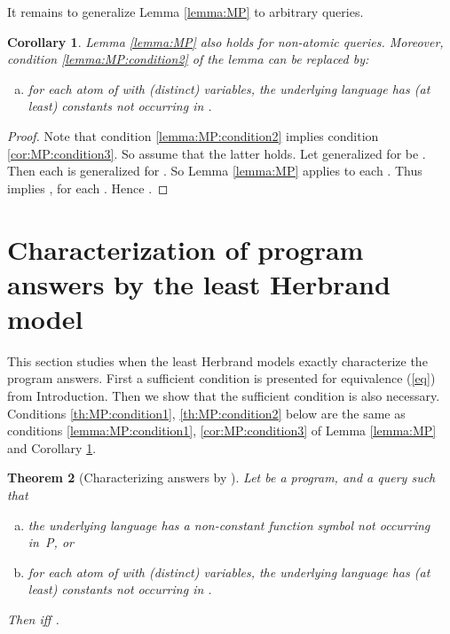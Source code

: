 \documentclass[a4paper]{tlp2}
\newtheorem{theorem}{Theorem}
\newtheorem{corollary}[theorem]{Corollary}
\begin{document}
It remains to generalize Lemma \ref{lemma:MP} to arbitrary queries.

\begin{corollary}
\label{cor:MP}
Lemma \ref{lemma:MP} also holds for non-atomic queries.  Moreover, condition
\ref{lemma:MP:condition2} of the lemma can be replaced by:
\begin{enumerate}[(a)]
\setcounter{enumi}2
\item
\label{cor:MP:condition3}
for each atom  of  with   (distinct) variables,
the underlying language has (at least)  constants not occurring in .
\end{enumerate}
\end{corollary}

\begin{proof}
Note that condition \ref{lemma:MP:condition2} implies condition
\ref{cor:MP:condition3}.
So assume that the latter holds.
Let   generalized for  be .
Then each  is   generalized for .
So Lemma \ref{lemma:MP} applies to each .  Thus  implies
, for each .
Hence .
\end{proof}








\section{Characterization of program answers by the least Herbrand model}
\label{sec:H}

This section studies when the least Herbrand models exactly characterize the
program answers. 
First a sufficient condition is presented for equivalence (\ref{eq}) from
Introduction.
Then we show that the sufficient condition is also necessary.
Conditions \ref{th:MP:condition1}, \ref{th:MP:condition2} below are the same
as conditions \ref{lemma:MP:condition1}, \ref{cor:MP:condition3}
 of Lemma \ref{lemma:MP} and  Corollary \ref{cor:MP}.



\begin{theorem}
[Characterizing answers by ]
\label{th:MP}
Let  be a program, and  a query such that
\begin{enumerate}[(a)]
\item 
\label{th:MP:condition1}
the underlying language has a non-constant function symbol not occurring in~P,
or 
\item 
\label{th:MP:condition2}
for each atom  of  with   (distinct) variables,
the underlying language has (at least)  constants not occurring in .
\nopagebreak
\end{enumerate}
\nopagebreak
Then  iff .
\end{theorem}
\end{document}
